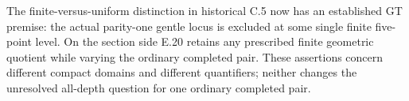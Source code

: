 The finite-versus-uniform distinction in
historical C.5 now has an established GT
premise: the actual parity-one gentle locus
is excluded at some single finite five-point
level.  On the section side E.20 retains
any prescribed finite geometric quotient
while varying the ordinary completed pair.
These assertions concern different compact
domains and different quantifiers; neither
changes the unresolved all-depth question
for one ordinary completed pair.
